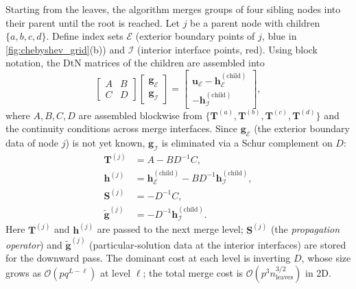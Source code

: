\documentclass[hidelinks,onefignum,onetabnum]{siamart251216}
\begin{document}
Starting from the leaves, the algorithm merges groups of four sibling nodes into
their parent until the root is reached.
Let $j$ be a parent node with children $\{a, b, c, d\}$.
Define index sets $\mathcal{E}$ (exterior boundary points of $j$, blue in
\cref{fig:chebyshev_grid}(b)) and $\mathcal{I}$ (interior interface points, red).
Using block notation, the DtN matrices of the children are assembled into
\begin{equation}\label{eq:block_system}
  \begin{bmatrix} A & B \\ C & D \end{bmatrix}
  \begin{bmatrix} \mathbf{g}_\mathcal{E} \\ \mathbf{g}_\mathcal{I} \end{bmatrix}
  = \begin{bmatrix}
      \mathbf{u}_\mathcal{E} - \mathbf{h}^{(\text{child})}_\mathcal{E} \\
      - \mathbf{h}^{(\text{child})}_\mathcal{I}
    \end{bmatrix},
\end{equation}
where $A, B, C, D$ are assembled blockwise from $\{\mathbf{T}^{(a)}, \mathbf{T}^{(b)},
\mathbf{T}^{(c)}, \mathbf{T}^{(d)}\}$ and the continuity conditions across merge
interfaces.
Since $\mathbf{g}_\mathcal{E}$ (the exterior boundary data of node $j$) is not yet
known, $\mathbf{g}_\mathcal{I}$ is eliminated via a Schur complement on $D$:
\begin{align}
  \mathbf{T}^{(j)} &= A - B D^{-1} C,
  \label{eq:T_merge}\\
  \mathbf{h}^{(j)} &= \mathbf{h}^{(\text{child})}_\mathcal{E}
                     - B D^{-1} \mathbf{h}^{(\text{child})}_\mathcal{I},
  \label{eq:h_merge}\\
  \mathbf{S}^{(j)} &= -D^{-1} C,
  \label{eq:S_merge}\\
  \tilde{\mathbf{g}}^{(j)} &= -D^{-1} \mathbf{h}^{(\text{child})}_\mathcal{I}.
  \label{eq:gtilde_merge}
\end{align}
Here $\mathbf{T}^{(j)}$ and $\mathbf{h}^{(j)}$ are passed to the next merge level;
$\mathbf{S}^{(j)}$ (the \emph{propagation operator}) and $\tilde{\mathbf{g}}^{(j)}$
(particular-solution data at the interior interfaces) are stored for the downward
pass.
The dominant cost at each level is inverting $D$, whose size grows as $\mathcal{O}(pq^{L-\ell})$
at level $\ell$; the total merge cost is $\mathcal{O}(p^3 n_\text{leaves}^{3/2})$ in 2D.
\end{document}
